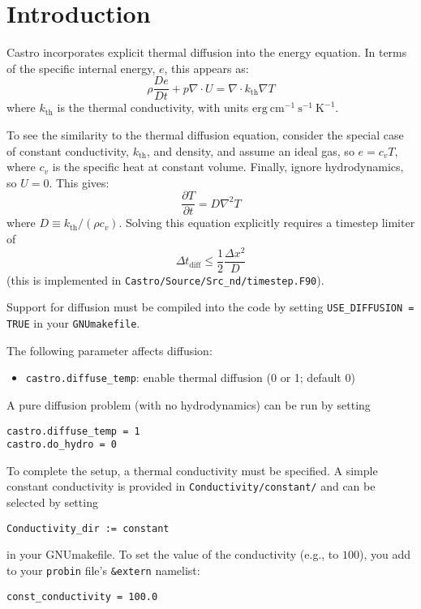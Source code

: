 \label{ch:diffusion}

\section{Introduction}

Castro incorporates explicit thermal diffusion into the energy equation.  
In terms of the specific internal energy, $e$, this appears as:
\begin{equation}
\rho \frac{De}{Dt} + p \nabla \cdot U = \nabla \cdot k_\mathrm{th} \nabla T
\end{equation}
where $k_\mathrm{th}$ is the thermal conductivity, with units
$\mathrm{erg~cm^{-1}~s^{-1}~K^{-1}}$.

To see the similarity to the thermal diffusion equation, consider the special
case of constant conductivity, $k_\mathrm{th}$, and density, and assume an
ideal gas, so $e = c_v T$, where $c_v$ is the specific heat at constant volume.
Finally, ignore hydrodynamics, so $U = 0$.  This gives:
\begin{equation}
\frac{\partial T}{\partial t} = D \nabla^2 T
\end{equation}
where $D \equiv k_\mathrm{th}/(\rho c_v)$.  Solving this equation
explicitly requires a timestep limiter of
\begin{equation}
\Delta t_\mathrm{diff} \le \frac{1}{2} \frac{\Delta x^2}{D}
\end{equation}
(this is implemented in {\tt Castro/Source/Src\_nd/timestep.F90}).

Support for diffusion must be compiled into the code by setting
{\tt USE\_DIFFUSION = TRUE} in your {\tt GNUmakefile}.


The following parameter affects diffusion:
\begin{itemize}
\item {\tt castro.diffuse\_temp}:  enable thermal diffusion (0 or 1; default 0)
\end{itemize}

A pure diffusion problem (with no hydrodynamics) can be run by setting
\begin{verbatim}
castro.diffuse_temp = 1
castro.do_hydro = 0
\end{verbatim}

To complete the setup, a thermal conductivity must be specified.
A simple constant conductivity is provided in {\tt Conductivity/constant/}
and can be selected by setting
\begin{verbatim}
Conductivity_dir := constant
\end{verbatim}
in your GNUmakefile.  To set the value of the conductivity (e.g., to
$100$), you add to your {\tt probin} file's {\tt \&extern} namelist:
\begin{verbatim}
const_conductivity = 100.0
\end{verbatim}


